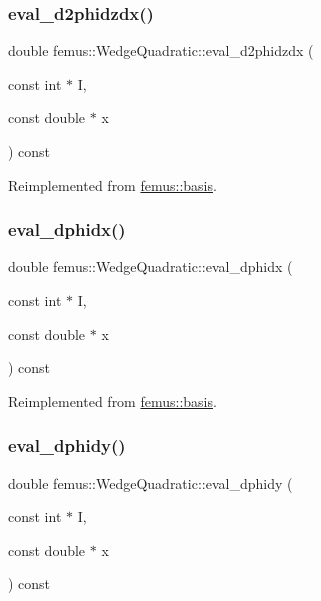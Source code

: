 \subsubsection{\texorpdfstring{eval\+\_\+d2phidzdx()}{eval\_d2phidzdx()}}
{\footnotesize\ttfamily double femus\+::\+Wedge\+Quadratic\+::eval\+\_\+d2phidzdx (\begin{DoxyParamCaption}\item[{const int $\ast$}]{I,  }\item[{const double $\ast$}]{x }\end{DoxyParamCaption}) const\hspace{0.3cm}{\ttfamily [virtual]}}



Reimplemented from \mbox{\hyperlink{classfemus_1_1basis_a5d619ec5bd57b7d2dc34a99d69975c77}{femus\+::basis}}.

\mbox{\label{classfemus_1_1_wedge_quadratic_a57c70663dcb6cdda9adea4eeb93a75ba}} 
\subsubsection{\texorpdfstring{eval\+\_\+dphidx()}{eval\_dphidx()}}
{\footnotesize\ttfamily double femus\+::\+Wedge\+Quadratic\+::eval\+\_\+dphidx (\begin{DoxyParamCaption}\item[{const int $\ast$}]{I,  }\item[{const double $\ast$}]{x }\end{DoxyParamCaption}) const\hspace{0.3cm}{\ttfamily [virtual]}}



Reimplemented from \mbox{\hyperlink{classfemus_1_1basis_a4db7d29cf8a753ddbccc4a297dafa0bf}{femus\+::basis}}.

\mbox{\label{classfemus_1_1_wedge_quadratic_afc2bb550f1fc80835eb52bf6a628e8a1}} 
\subsubsection{\texorpdfstring{eval\+\_\+dphidy()}{eval\_dphidy()}}
{\footnotesize\ttfamily double femus\+::\+Wedge\+Quadratic\+::eval\+\_\+dphidy (\begin{DoxyParamCaption}\item[{const int $\ast$}]{I,  }\item[{const double $\ast$}]{x }\end{DoxyParamCaption}) const\hspace{0.3cm}{\ttfamily [virtual]}}



